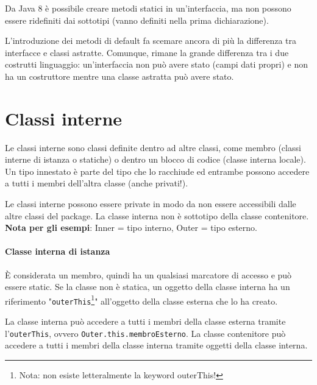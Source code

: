 Da Java 8 è possibile creare metodi statici in un'interfaccia, ma non possono essere ridefiniti dai sottotipi (vanno definiti nella prima dichiarazione).

L’introduzione dei metodi di default fa scemare ancora di pi\`u la differenza tra interfacce e classi astratte. Comunque, rimane la grande differenza tra i due costrutti linguaggio: un'interfaccia non pu\`o avere stato (campi dati propri) e non ha un costruttore mentre una classe astratta pu\`o avere stato.

\section{Classi interne}
Le classi interne sono classi definite dentro ad altre classi, come membro (classi interne di istanza o statiche) o dentro un blocco di codice (classe interna locale). Un tipo innestato è parte del tipo che lo racchiude ed entrambe possono accedere a tutti i membri dell'altra classe (anche privati!).

Le classi interne possono essere private in modo da non essere accessibili dalle altre classi del package.
La classe interna non è sottotipo della classe contenitore. \\
\textbf{Nota per gli esempi}: Inner = tipo interno, Outer = tipo esterno.

\paragraph{Classe interna di istanza}
È considerata un membro, quindi ha un qualsiasi marcatore di accesso e può essere static. Se la classe non è statica, un oggetto della classe interna ha un riferimento "\texttt{outerThis}\footnote{Nota: non esiste letteralmente la keyword outerThis!}" all'oggetto della classe esterna che lo ha creato.

La classe interna può accedere a tutti i membri della classe esterna tramite l'\texttt{outerThis}, ovvero \texttt{Outer.this.membroEsterno}.
La classe contenitore può accedere a tutti i membri della classe interna tramite oggetti della classe interna.

